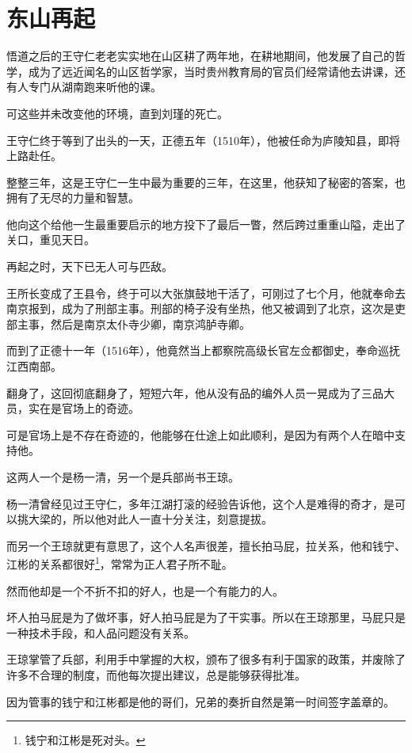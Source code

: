 \section{东山再起}
\ifnum{}
	\begin{multicols}{\theparacolNo}
		\fi
		悟道之后的王守仁老老实实地在山区耕了两年地，在耕地期间，他发展了自己的哲学，成为了远近闻名的山区哲学家，当时贵州教育局的官员们经常请他去讲课，还有人专门从湖南跑来听他的课。

		可这些并未改变他的环境，直到刘瑾的死亡。

		王守仁终于等到了出头的一天，正德五年（1510年），他被任命为庐陵知县，即将上路赴任。

		整整三年，这是王守仁一生中最为重要的三年，在这里，他获知了秘密的答案，也拥有了无尽的力量和智慧。

		他向这个给他一生最重要启示的地方投下了最后一瞥，然后跨过重重山隘，走出了关口，重见天日。

		再起之时，天下已无人可与匹敌。

		王所长变成了王县令，终于可以大张旗鼓地干活了，可刚过了七个月，他就奉命去南京报到，成为了刑部主事。刑部的椅子没有坐热，他又被调到了北京，这次是吏部主事，然后是南京太仆寺少卿，南京鸿胪寺卿。

		而到了正德十一年（1516年），他竟然当上都察院高级长官左佥都御史，奉命巡抚江西南部。

		翻身了，这回彻底翻身了，短短六年，他从没有品的编外人员一晃成为了三品大员，实在是官场上的奇迹。

		可是官场上是不存在奇迹的，他能够在仕途上如此顺利，是因为有两个人在暗中支持他。

		这两人一个是杨一清，另一个是兵部尚书王琼。

		杨一清曾经见过王守仁，多年江湖打滚的经验告诉他，这个人是难得的奇才，是可以挑大梁的，所以他对此人一直十分关注，刻意提拔。

		而另一个王琼就更有意思了，这个人名声很差，擅长拍马屁，拉关系，他和钱宁、江彬的关系都很好\footnote{钱宁和江彬是死对头。}，常常为正人君子所不耻。

		然而他却是一个不折不扣的好人，也是一个有能力的人。

		坏人拍马屁是为了做坏事，好人拍马屁是为了干实事。所以在王琼那里，马屁只是一种技术手段，和人品问题没有关系。

		王琼掌管了兵部，利用手中掌握的大权，颁布了很多有利于国家的政策，并废除了许多不合理的制度，而他每次提出建议，总是能够获得批准。

		因为管事的钱宁和江彬都是他的哥们，兄弟的奏折自然是第一时间签字盖章的。


\end{multicols}
